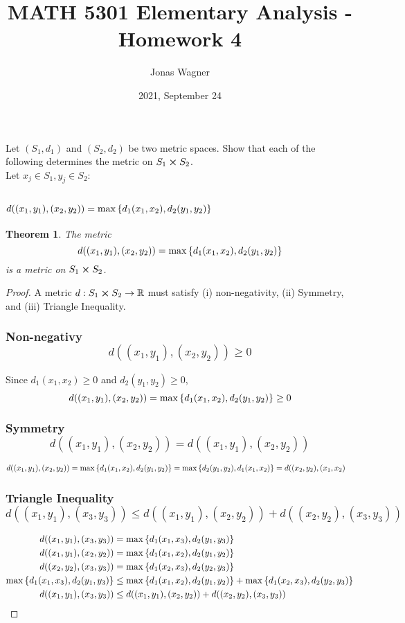 \documentclass[]{article}
\title{MATH 5301 Elementary Analysis - Homework 4}
\author{Jonas Wagner}
\date{2021, September 24}
\newcommand{\R}{\mathbb{R}}
\newtheorem{theorem}{Theorem}
\begin{document}
\maketitle

\section{}
Let $(S_1,d_1)$ and $(S_2,d_2)$ be two metric spaces. 
Show that each of the following determines the metric on $S_1 \cross S_2$.\\
Let $x_j \in S_1, y_j \in S_2$:
\subsection{$d((x_1,y_1),(x_2,y_2)) = \max\qty{d_1(x_1,x_2),d_2(y_1,y_2)}$}

\begin{theorem}
    The metric $$d((x_1,y_1),(x_2,y_2)) = \max\qty{d_1(x_1,x_2),d_2(y_1,y_2)}$$ 
    is a metric on $S_1 \cross S_2$.
\end{theorem}
\begin{proof}
    A metric $d: S_1 \cross S_2 \to \R$ must satisfy (i) non-negativity, 
    (ii) Symmetry, and (iii) Triangle Inequality.
    \subsubsection{Non-negativy $$d((x_1,y_1), (x_2,y_2)) \geq 0$$}
        Since $d_1(x_1,x_2) \geq 0$ and $d_2(y_1,y_2) \geq 0$,
        $$d((x_1,y_1), (x_2,y_2)) = \max\qty{d_1(x_1,x_2),d_2(y_1,y_2)} \geq 0$$
    \subsubsection{Symmetry $$d((x_1,y_1),(x_2,y_2))=d((x_1,y_1),(x_2,y_2))$$}
    \begin{align*}
        d((x_1,y_1), (x_2,y_2)) = \max\qty{d_1(x_1,x_2),d_2(y_1,y_2)} 
        &= \max\qty{d_2(y_1,y_2),d_1(x_1,x_2)} = d((x_2,y_2),(x_1,x_2)
    \end{align*}
    \subsubsection{Triangle Inequality 
    $$d((x_1,y_1),(x_3,y_3)) \leq d((x_1,y_1),(x_2,y_2)) + d((x_2,y_2),(x_3,y_3))$$
    }
    \begin{align*}
        d((x_1,y_1),(x_3,y_3)) &= \max\qty{d_1(x_1,x_3), d_2(y_1,y_3)}\\
        d((x_1,y_1),(x_2,y_2)) &= \max\qty{d_1(x_1,x_2), d_2(y_1,y_2)}\\
        d((x_2,y_2),(x_3,y_3)) &= \max\qty{d_1(x_2,x_3), d_2(y_2,y_3)}\\
        \max\qty{d_1(x_1,x_3), d_2(y_1,y_3)} 
            &\leq \max\qty{d_1(x_1,x_2), d_2(y_1,y_2)}
            + \max\qty{d_1(x_2,x_3), d_2(y_2,y_3)}\\
        d((x_1,y_1),(x_3,y_3)) &\leq d((x_1,y_1),(x_2,y_2)) + d((x_2,y_2),(x_3,y_3))
    \end{align*}
\end{proof}
\end{document}
